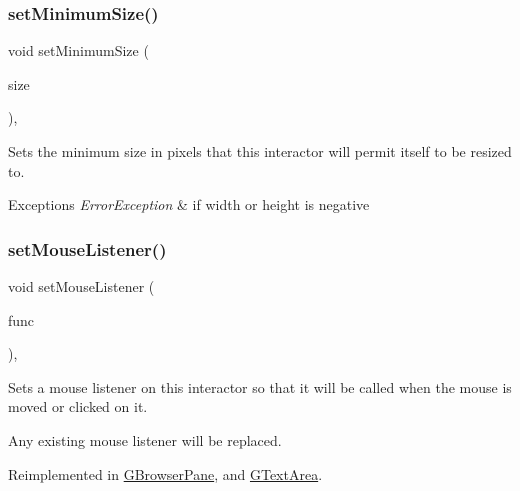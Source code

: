\subsubsection{\texorpdfstring{set\+Minimum\+Size()}{setMinimumSize()}\hspace{0.1cm}{\footnotesize\ttfamily [2/2]}}
{\footnotesize\ttfamily void set\+Minimum\+Size (\begin{DoxyParamCaption}\item[{const \mbox{\hyperlink{structGDimension}{G\+Dimension}} \&}]{size }\end{DoxyParamCaption})\hspace{0.3cm}{\ttfamily [virtual]}, {\ttfamily [inherited]}}



Sets the minimum size in pixels that this interactor will permit itself to be resized to. 


\begin{DoxyExceptions}{Exceptions}
{\em Error\+Exception} & if width or height is negative \\
\hline
\end{DoxyExceptions}
\mbox{\label{classGInteractor_a37d8dbc943f59920f705b0104f60bde2}} 
\subsubsection{\texorpdfstring{set\+Mouse\+Listener()}{setMouseListener()}\hspace{0.1cm}{\footnotesize\ttfamily [1/2]}}
{\footnotesize\ttfamily void set\+Mouse\+Listener (\begin{DoxyParamCaption}\item[{G\+Event\+Listener}]{func }\end{DoxyParamCaption})\hspace{0.3cm}{\ttfamily [virtual]}, {\ttfamily [inherited]}}



Sets a mouse listener on this interactor so that it will be called when the mouse is moved or clicked on it. 

Any existing mouse listener will be replaced. 

Reimplemented in \mbox{\hyperlink{classGBrowserPane_a2c6a3746da7ffa3819294896d4423059}{G\+Browser\+Pane}}, and \mbox{\hyperlink{classGTextArea_a2c6a3746da7ffa3819294896d4423059}{G\+Text\+Area}}.

